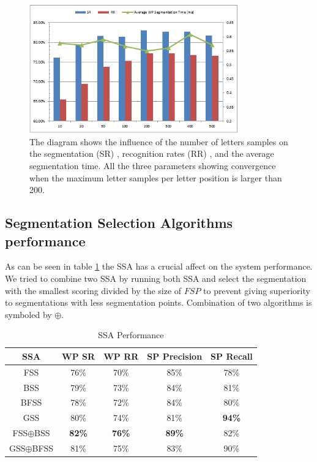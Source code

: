 \documentclass[journal,compsoc]{IEEEtran}
\begin{document}
\begin{figure}[h]
\centering
\includegraphics[width=9cm]{./figures/num_letter_impact}
\caption{The diagram shows the influence of the number of letters samples on the segmentation (SR) , recognition rates (RR) , and the average segmentation time. All the three parameters showing convergence when the maximum letter samples per letter position is larger than 200. }
\label{fig:num_letter_impact}
\end{figure}


\subsection{Segmentation Selection Algorithms performance}
\label{subsec:ssa_performance}
As can be seen in table \ref{table:ss_algorithms_results} the SSA has a crucial affect on the system performance. We tried to combine two SSA by running both SSA and select the segmentation with the smallest scoring divided by the size of $FSP$ to prevent giving superiority to segmentations with less segmentation points. Combination of two algorithms is symboled by $\oplus$.

\begin{table}[h]
\caption{SSA Performance}
\begin{tabular}{ | c | c | c | c | c |}
\hline
SSA & WP SR & WP RR & SP Precision & SP Recall\\
\hline                 
  FSS & 76\% & 70\% & 85\% & 78\% \\ 
  \hline
  BSS & 79\% &  73\% & 84\%& 81\% \\
  \hline
  BFSS & 78\% & 72\% & 84\% & 80\%\\ 
  \hline
  GSS & 80\% & 74\% & 81\% & \bf{94}\% \\  
  \hline
  FSS$\oplus$BSS & \bf{82}\% & \bf{76}\% & \bf{89}\% & 82\%\\  
  \hline
  GSS$\oplus$BFSS & 81\% & 75\% & 83\% & 90\% \\
  \hline
\end{tabular}
\centering
\label{table:ss_algorithms_results} 
\end{table}
\end{document}
